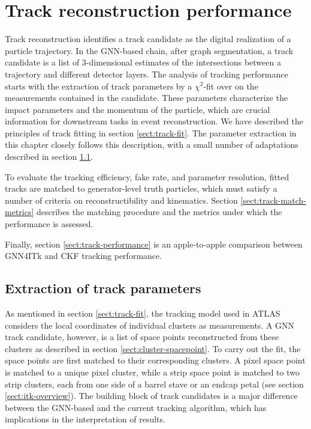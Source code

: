 \chapter{Track reconstruction performance}
\label{chap:tracking-performance}
Track reconstruction identifies a track candidate as the digital realization of a particle trajectory. 
In the GNN-based chain, after graph segmentation, a track candidate is a list of 3-dimensional estimates of the intersections between a trajectory and different detector layers. 
The analysis of tracking performance starts with the extraction of track parameters by a $\chi^2$-fit over on the measurements contained in the candidate.
These parameters characterize the impact parameters and the momentum of the particle, which are crucial information for downstream tasks in event reconstruction. 
We have described the principles of track fitting in section \ref{sect:track-fit}.
The parameter extraction in this chapter closely follows this description, with a small number of adaptations described in section \ref{sect:chi2-fit}.

To evaluate the tracking efficiency, fake rate, and parameter resolution, fitted tracks are matched to generator-level truth particles, which must satisfy a number of criteria on reconstructibility and kinematics.
Section \ref{sect:track-match-metrics} describes the matching procedure and the metrics under which the performance is assessed.

Finally, section \ref{sect:track-performance} is an apple-to-apple comparison between GNN4ITk and CKF tracking performance.



\section{Extraction of track parameters}
\label{sect:chi2-fit}

As mentioned in section \ref{sect:track-fit}, the tracking model used in ATLAS considers the local coordinates of individual clusters as measurements.
A GNN track candidate, however, is a list of space points reconstructed from these clusters as described in section \ref{sect:cluster-spacepoint}. 
To carry out the fit, the space points are first matched to their corresponding clusters. 
A pixel space point is matched to a unique pixel cluster, while a strip space point is matched to two strip clusters, each from one side of a barrel stave or an endcap petal (see section \ref{sect:itk-overview}). 
The building block of track candidates is a major difference between the GNN-based and the current tracking algorithm, which has implications in the interpretation of results.

